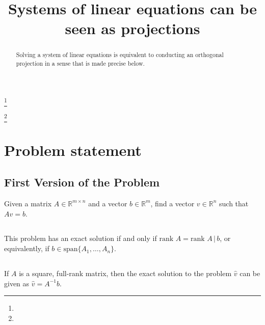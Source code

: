 \documentclass{proc-l}
\theoremstyle{definition}
\theoremstyle{remark}
\numberwithin{equation}{section}
\newcommand{\R}{\mathbb{R}}
\newcommand{\rank}[1]{\textrm{rank } {#1}}
\newcommand{\x}{\times}
\begin{document}
\title{Systems of linear equations can be seen as projections}


\address{}
\curraddr{}
\email{}
\thanks{}

\address{}
\curraddr{}
\email{}
\thanks{}





\begin{abstract}
Solving a system of linear equations is equivalent to conducting an orthogonal projection in a sense that is made precise below.
\end{abstract}

\maketitle

\section{Problem statement}

\subsection{First Version of the Problem}
Given a matrix $A\in \R^{m \x n}$ and a vector $b\in \R^m$, find a vector $v\in\R^n$ such that $Av=b$.

\subsection{} 
This problem has an exact solution if and only if $\rank{A} = \rank{A\,|\,b}$, or equivalently, if $b \in \textrm{span}\{A_1, \ldots, A_n\}$.

\subsection{} 
If $A$ is a square, full-rank matrix, then the exact solution to the problem $\hat{v}$ can be given as $\hat{v} = A^{-1}b$.
\end{document}
